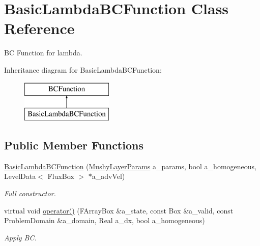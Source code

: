 \hypertarget{class_basic_lambda_b_c_function}{\section{Basic\-Lambda\-B\-C\-Function Class Reference}
\label{class_basic_lambda_b_c_function}
}


B\-C Function for lambda.  


Inheritance diagram for Basic\-Lambda\-B\-C\-Function\-:\begin{figure}[H]
\begin{center}
\leavevmode
\includegraphics[height=2.000000cm]{class_basic_lambda_b_c_function}
\end{center}
\end{figure}
\subsection*{Public Member Functions}
\begin{DoxyCompactItemize}
\item 
\hypertarget{class_basic_lambda_b_c_function_a8eaa8e286125ef0757d111e7dec42f2a}{\hyperlink{class_basic_lambda_b_c_function_a8eaa8e286125ef0757d111e7dec42f2a}{Basic\-Lambda\-B\-C\-Function} (\hyperlink{class_mushy_layer_params}{Mushy\-Layer\-Params} a\-\_\-params, bool a\-\_\-homogeneous, Level\-Data$<$ Flux\-Box $>$ $\ast$a\-\_\-adv\-Vel)}\label{class_basic_lambda_b_c_function_a8eaa8e286125ef0757d111e7dec42f2a}

\begin{DoxyCompactList}\small\item\em Full constructor. \end{DoxyCompactList}\item 
\hypertarget{class_basic_lambda_b_c_function_a52194325db1c4a734e2a331999bb8f44}{virtual void \hyperlink{class_basic_lambda_b_c_function_a52194325db1c4a734e2a331999bb8f44}{operator()} (F\-Array\-Box \&a\-\_\-state, const Box \&a\-\_\-valid, const Problem\-Domain \&a\-\_\-domain, Real a\-\_\-dx, bool a\-\_\-homogeneous)}\label{class_basic_lambda_b_c_function_a52194325db1c4a734e2a331999bb8f44}

\begin{DoxyCompactList}\small\item\em Apply B\-C. \end{DoxyCompactList}\end{DoxyCompactItemize}

